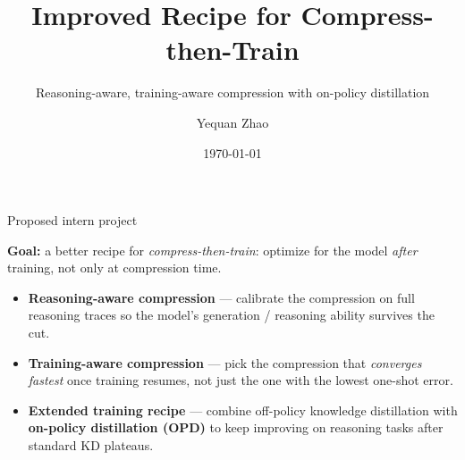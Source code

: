 \documentclass[9pt]{beamer}
\title{Improved Recipe for Compress-then-Train}
\subtitle{Reasoning-aware, training-aware compression with on-policy distillation}
\author{Yequan Zhao}
\date{\today}
\begin{document}
	
	\maketitle
	
	\begin{frame}{Proposed intern project}
		
		\textbf{Goal:} a better recipe for \emph{compress-then-train}: optimize for the model \emph{after} training, not only at compression time.
		
		\begin{itemize}
			\item \textbf{Reasoning-aware compression} --- calibrate the compression on full reasoning traces so the model's generation / reasoning ability survives the cut.
			\item \textbf{Training-aware compression} --- pick the compression that
			\emph{converges fastest} once training resumes, not just the one with the
			lowest one-shot error.
			\item \textbf{Extended training recipe} --- combine off-policy knowledge
			distillation with \textbf{on-policy distillation (OPD)} to keep improving
			on reasoning tasks after standard KD plateaus.
		\end{itemize}
		
	\end{frame}
\end{document}
